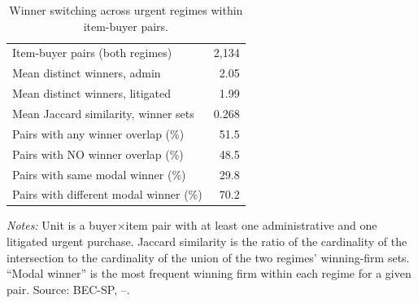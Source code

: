 \begin{table}[ht]
\centering
\caption{Winner switching across urgent regimes within item-buyer pairs.}
\label{tab:winner_switch}
\begin{threeparttable}
\begin{tabular}{lr}
\toprule
Item-buyer pairs (both regimes) & 2,134 \\
Mean distinct winners, admin & 2.05 \\
Mean distinct winners, litigated & 1.99 \\
Mean Jaccard similarity, winner sets & 0.268 \\
Pairs with any winner overlap (\%) & 51.5 \\
Pairs with NO winner overlap (\%) & 48.5 \\
Pairs with same modal winner (\%) & 29.8 \\
Pairs with different modal winner (\%) & 70.2 \\
\midrule
\bottomrule
\end{tabular}
\begin{tablenotes}[flushleft]\footnotesize
\item \textit{Notes:} Unit is a buyer$\times$item pair with at least one administrative and one litigated urgent purchase. Jaccard similarity is the ratio of the cardinality of the intersection to the cardinality of the union of the two regimes' winning-firm sets. ``Modal winner'' is the most frequent winning firm within each regime for a given pair. Source: BEC-SP, \BPsampleStartYear--\BPsampleEndYear.
\end{tablenotes}
\end{threeparttable}
\end{table}
